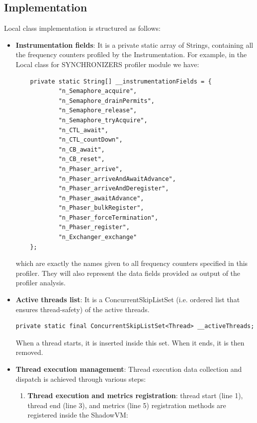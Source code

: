 \documentclass[]{usiinfthesis}
\begin{document}
\subsection{Implementation}
Local class implementation is structured as follows:

\begin{itemize}
    \item \textbf{Instrumentation fields}: It is a private static array of Strings, containing all the frequency counters profiled by the Instrumentation. For example, in the Local class for SYNCHRONIZERS profiler module we have:
    
\vspace*{0.25cm}
    \begin{verbatim}
    private static String[] __instrumentationFields = {
            "n_Semaphore_acquire",
            "n_Semaphore_drainPermits",
            "n_Semaphore_release",
            "n_Semaphore_tryAcquire",
            "n_CTL_await",
            "n_CTL_countDown",
            "n_CB_await",
            "n_CB_reset",
            "n_Phaser_arrive",
            "n_Phaser_arriveAndAwaitAdvance",
            "n_Phaser_arriveAndDeregister",
            "n_Phaser_awaitAdvance",
            "n_Phaser_bulkRegister",
            "n_Phaser_forceTermination",
            "n_Phaser_register",
            "n_Exchanger_exchange"
    };
    \end{verbatim}
    \vspace*{0.25cm}
    which are exactly the names given to all frequency counters specified in this profiler. They will also represent the data fields provided as output of the profiler analysis.
    \item \textbf{Active threads list}: It is a ConcurrentSkipListSet (i.e. ordered list that ensures thread-safety) of the active threads.
    \vspace*{0.25cm}
    \begin{verbatim}
private static final ConcurrentSkipListSet<Thread> __activeThreads;
        \end{verbatim}
        \vspace*{0.25cm}
    When a thread starts, it is inserted inside this set. When it ends, it is then removed.
    
    \item \textbf{Thread execution management}: Thread execution data collection and dispatch is achieved through various steps:
    \begin{enumerate}
         \item \textbf{Thread execution and metrics registration}: thread start (line 1), thread end (line 3), and metrics (line 5) registration methods are registered inside the ShadowVM:
         

\end{enumerate}
\end{itemize}
\end{document}
